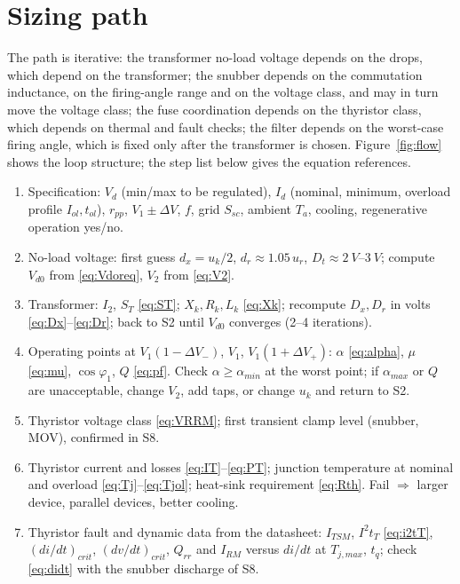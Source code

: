 \documentclass[10pt,a4paper]{scrartcl}
\newcommand{\Vdo}{V_{d0}}
\newcommand{\Vd}{V_{d}}
\newcommand{\Id}{I_{d}}
\newcommand{\Vll}{V_{2}}
\newcommand{\Xk}{X_{k}}
\newcommand{\Lk}{L_{k}}
\newcommand{\Rk}{R_{k}}
\newcommand{\uk}{u_{k}}
\newcommand{\ur}{u_{r}}
\newcommand{\Dx}{D_{x}}
\newcommand{\Dr}{D_{r}}
\newcommand{\Dt}{D_{t}}
\newcommand{\ITSM}{I_{TSM}}
\newcommand{\iit}{I^{2}t}
\begin{document}
\section{Sizing path}
The path is iterative: the transformer no-load voltage depends on the drops, which depend on the transformer; the snubber depends on the commutation inductance, on the firing-angle range and on the voltage class, and may in turn move the voltage class; the fuse coordination depends on the thyristor class, which depends on thermal and fault checks; the filter depends on the worst-case firing angle, which is fixed only after the transformer is chosen. Figure~\ref{fig:flow} shows the loop structure; the step list below gives the equation references.

\begin{enumerate}[label=\textbf{S\arabic*},leftmargin=*]
\item Specification: $\Vd$ (min/max to be regulated), $\Id$ (nominal, minimum, overload profile $I_{ol},t_{ol}$), $r_{pp}$, $V_1 \pm \Delta V$, $f$, grid $S_{sc}$, ambient $T_a$, cooling, regenerative operation yes/no.
\item No-load voltage: first guess $d_x = \uk/2$, $d_r \approx 1.05\,\ur$, $\Dt \approx \SIrange{2}{3}{V}$; compute $\Vdo$ from \eqref{eq:Vdoreq}, $\Vll$ from \eqref{eq:V2}.
\item Transformer: $I_2$, $S_T$ \eqref{eq:ST}; $\Xk,\Rk,\Lk$ \eqref{eq:Xk}; recompute $\Dx,\Dr$ in volts \eqref{eq:Dx}--\eqref{eq:Dr}; back to S2 until $\Vdo$ converges (2--4 iterations).
\item Operating points at $V_1(1-\Delta V_-)$, $V_1$, $V_1(1+\Delta V_+)$: $\alpha$ \eqref{eq:alpha}, $\mu$ \eqref{eq:mu}, $\cos\varphi_1$, $Q$ \eqref{eq:pf}. Check $\alpha \ge \alpha_{min}$ at the worst point; if $\alpha_{max}$ or $Q$ are unacceptable, change $\Vll$, add taps, or change $\uk$ and return to S2.
\item Thyristor voltage class \eqref{eq:VRRM}; first transient clamp level (snubber, MOV), confirmed in S8.
\item Thyristor current and losses \eqref{eq:IT}--\eqref{eq:PT}; junction temperature at nominal and overload \eqref{eq:Tj}--\eqref{eq:Tjol}; heat-sink requirement \eqref{eq:Rth}. Fail $\Rightarrow$ larger device, parallel devices, better cooling.
\item Thyristor fault and dynamic data from the datasheet: $\ITSM$, $\iit_T$ \eqref{eq:i2tT}, $(di/dt)_{crit}$, $(dv/dt)_{crit}$, $Q_{rr}$ and $I_{RM}$ versus $di/dt$ at $T_{j,max}$, $t_q$; check \eqref{eq:didt} with the snubber discharge of S8.

\end{enumerate}
\end{document}
